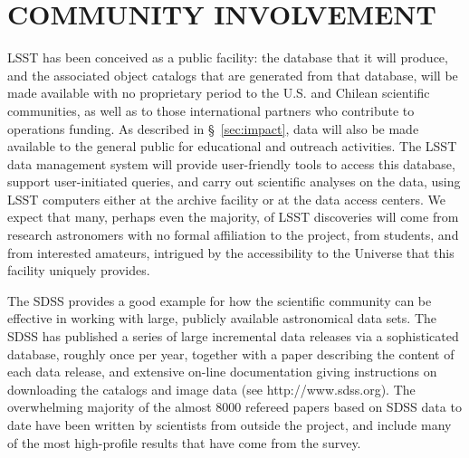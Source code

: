 \section{  COMMUNITY INVOLVEMENT   }
\label{Sec:community}
 
LSST has been conceived as a public facility: the database that it will
produce, and the associated object catalogs that are generated from that
database, will be made available with no proprietary period to the
U.S. and Chilean scientific communities, as well as to those
international partners who contribute to operations funding.  As
described in \S~\ref{sec:impact}, data will also be made available to
the general public for educational and outreach activities.  
The LSST data management 
system will provide user-friendly tools to access this database, support
user-initiated queries, and carry out scientific analyses on the
data, using LSST computers either at the archive facility 
or at the data access centers. 
We expect that many, perhaps even the majority,
of LSST discoveries will come from research astronomers with no formal
affiliation to the project, from students, and from interested amateurs, 
intrigued by the accessibility to the Universe that this facility uniquely 
provides. 

The SDSS provides a good example for how the scientific 
community can be effective in working with large, publicly available
astronomical data sets. The SDSS has published a series of large incremental
data releases via a sophisticated database, roughly once per year, together with 
a paper describing the content of each data release, and extensive on-line 
documentation giving instructions on downloading the catalogs and image data
(see http://www.sdss.org). The overwhelming majority of the almost
8000 refereed papers based 
on SDSS data to date have been written by scientists from outside 
the project, and  include many of the most high-profile results that have come 
from the survey. 

